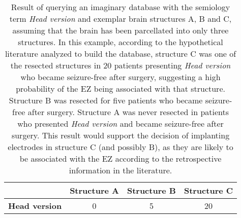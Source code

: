 \begin{table}
  \setlength{\tabcolsep}{3pt}
  \centering
  \caption{
    Result of querying an imaginary database with the semiology term \textit{Head version} and exemplar brain structures A, B and C, assuming that the brain has been parcellated into only three structures.
    In this example, according to the hypothetical literature analyzed to build the database, structure C was one of the resected structures in 20 patients presenting \textit{Head version} who became seizure-free after surgery, suggesting a high probability of the \ac{EZ} being associated with that structure.
    Structure B was resected for five patients who became seizure-free after surgery.
    Structure A was never resected in patients who presented \textit{Head version} and became seizure-free after surgery.
    This result would support the decision of implanting electrodes in structure C (and possibly B), as they are likely to be associated with the \ac{EZ} according to the retrospective information in the literature.
  }
  \label{tab:single_semiology}
  \begin{tabular}{l*3c}
    \toprule
                          & \textbf{Structure A} & \textbf{Structure B} & \textbf{Structure C} \\
    \midrule
    \textbf{Head version} &                    0 &                    5 &                   20 \\
  \end{tabular}
\end{table}
